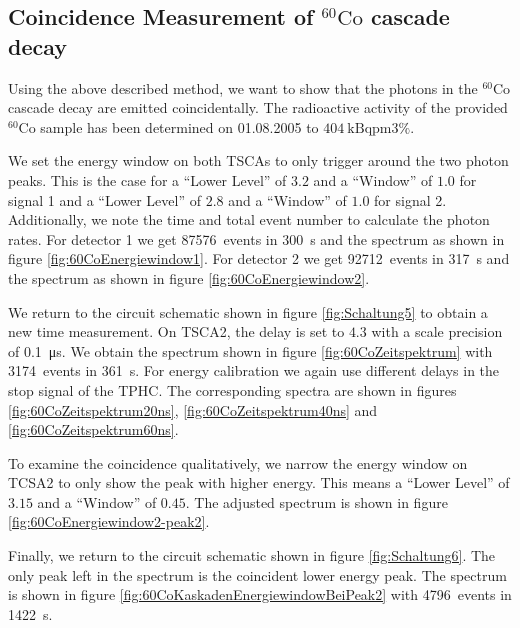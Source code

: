 \subsection{Coincidence Measurement of $^{60}\text{Co}$ cascade decay}
%
Using the above described method, we want to show that the photons in the $^{60}\text{Co}$ cascade decay are emitted coincidentally.
The radioactive activity of the provided $^{60}\text{Co}$ sample has been determined on 01.08.2005 to $\SI{404}{\kilo\becquerel \pm 3 \percent}$.
%
\par
%
We set the energy window on both TSCAs to only trigger around the two photon peaks.
This is the case for a \enquote{Lower Level} of $3.2$ and a \enquote{Window} of $1.0$ for signal 1 and a \enquote{Lower Level} of $2.8$ and a \enquote{Window} of $1.0$ for signal 2.
Additionally, we note the time and total event number to calculate the photon rates.
For detector 1 we get \SI{87576}{events} in \SI{300}{\second} and the spectrum as shown in figure \ref{fig:60CoEnergiewindow1}.
For detector 2 we get \SI{92712}{events} in \SI{317}{\second} and the spectrum as shown in figure \ref{fig:60CoEnergiewindow2}.
%
\par
%
We return to the circuit schematic shown in figure \ref{fig:Schaltung5} to obtain a new time measurement.
On TSCA2, the delay is set to $4.3$ with a scale precision of \SI{0.1}{\micro\second}.
We obtain the spectrum shown in figure \ref{fig:60CoZeitspektrum} with \SI{3174}{events} in \SI{361}{\second}.
For energy calibration we again use different delays in the stop signal of the TPHC.
The corresponding spectra are shown in figures \ref{fig:60CoZeitspektrum20ns}, \ref{fig:60CoZeitspektrum40ns} and \ref{fig:60CoZeitspektrum60ns}.
%
\par
%
To examine the coincidence qualitatively, we narrow the energy window on TCSA2 to only show the peak with higher energy.
This means a \enquote{Lower Level} of $3.15$ and a \enquote{Window} of $0.45$.
The adjusted spectrum is shown in figure \ref{fig:60CoEnergiewindow2-peak2}.
%
\par
%
Finally, we return to the circuit schematic shown in figure \ref{fig:Schaltung6}.
The only peak left in the spectrum is the coincident lower energy peak.
The spectrum is shown in figure \ref{fig:60CoKaskadenEnergiewindowBeiPeak2} with \SI{4796}{events} in \SI{1422}{\second}.
%
